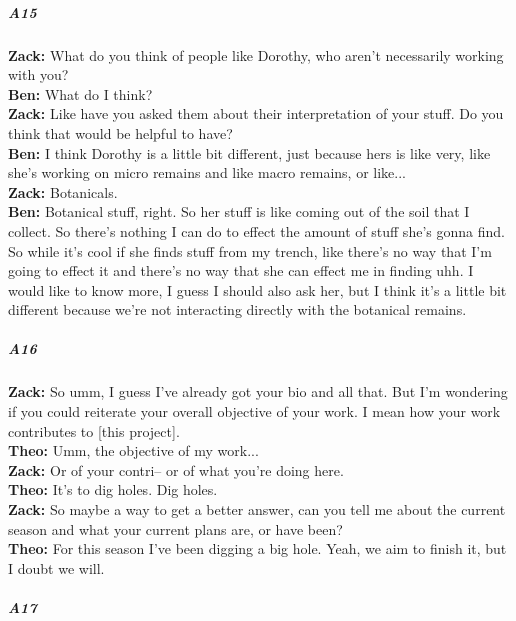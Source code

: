 \documentclass[
]{article}
\begin{document}
\subparagraph{A15}\label{sec-A15}

\textbf{Zack:} What do you think of people like Dorothy, who aren't
necessarily working with you?\\
\textbf{Ben:} What do I think?\\
\textbf{Zack:} Like have you asked them about their interpretation of
your stuff. Do you think that would be helpful to have?\\
\textbf{Ben:} I think Dorothy is a little bit different, just because
hers is like very, like she's working on micro remains and like macro
remains, or like...\\
\textbf{Zack:} Botanicals.\\
\textbf{Ben:} Botanical stuff, right. So her stuff is like coming out of
the soil that I collect. So there's nothing I can do to effect the
amount of stuff she's gonna find. So while it's cool if she finds stuff
from my trench, like there's no way that I'm going to effect it and
there's no way that she can effect me in finding uhh. I would like to
know more, I guess I should also ask her, but I think it's a little bit
different because we're not interacting directly with the botanical
remains.

\subparagraph{A16}\label{sec-A16}

\textbf{Zack:} So umm, I guess I've already got your bio and all that.
But I'm wondering if you could reiterate your overall objective of your
work. I mean how your work contributes to {[}this project{]}.\\
\textbf{Theo:} Umm, the objective of my work...\\
\textbf{Zack:} Or of your contri-- or of what you're doing here.\\
\textbf{Theo:} It's to dig holes. Dig holes.\\
\textbf{Zack:} So maybe a way to get a better answer, can you tell me
about the current season and what your current plans are, or have
been?\\
\textbf{Theo:} For this season I've been digging a big hole. Yeah, we
aim to finish it, but I doubt we will.

\subparagraph{A17}\label{sec-A17}
\end{document}
